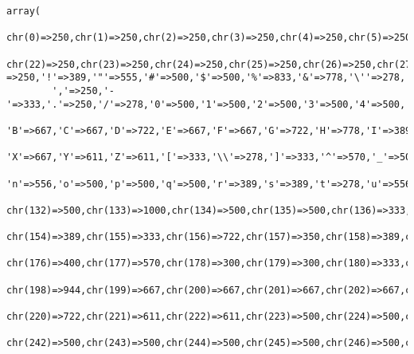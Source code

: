 \footnotesize\begin{verbatim}array(
        chr(0)=>250,chr(1)=>250,chr(2)=>250,chr(3)=>250,chr(4)=>250,chr(5)=>250,chr(6)=>250,chr(7)=>250,chr(8)=>250,chr(9)=>250,chr(10)=>250,chr(11)=>250,chr(12)=>250,chr(13)=>250,chr(14)=>250,chr(15)=>250,chr(16)=>250,chr(17)=>250,chr(18)=>250,chr(19)=>250,chr(20)=>250,chr(21)=>250,
        chr(22)=>250,chr(23)=>250,chr(24)=>250,chr(25)=>250,chr(26)=>250,chr(27)=>250,chr(28)=>250,chr(29)=>250,chr(30)=>250,chr(31)=>250, =>250,'!'=>389,'"'=>555,'#'=>500,'$'=>500,'%'=>833,'&'=>778,'\''=>278,'('=>333,')'=>333,'*'=>500,'+'=>570,
        ','=>250,'-'=>333,'.'=>250,'/'=>278,'0'=>500,'1'=>500,'2'=>500,'3'=>500,'4'=>500,'5'=>500,'6'=>500,'7'=>500,'8'=>500,'9'=>500,':'=>333,';'=>333,'<'=>570,'='=>570,'>'=>570,'?'=>500,'@'=>832,'A'=>667,
        'B'=>667,'C'=>667,'D'=>722,'E'=>667,'F'=>667,'G'=>722,'H'=>778,'I'=>389,'J'=>500,'K'=>667,'L'=>611,'M'=>889,'N'=>722,'O'=>722,'P'=>611,'Q'=>722,'R'=>667,'S'=>556,'T'=>611,'U'=>722,'V'=>667,'W'=>889,
        'X'=>667,'Y'=>611,'Z'=>611,'['=>333,'\\'=>278,']'=>333,'^'=>570,'_'=>500,'`'=>333,'a'=>500,'b'=>500,'c'=>444,'d'=>500,'e'=>444,'f'=>333,'g'=>500,'h'=>556,'i'=>278,'j'=>278,'k'=>500,'l'=>278,'m'=>778,
        'n'=>556,'o'=>500,'p'=>500,'q'=>500,'r'=>389,'s'=>389,'t'=>278,'u'=>556,'v'=>444,'w'=>667,'x'=>500,'y'=>444,'z'=>389,'{'=>348,'|'=>220,'}'=>348,'~'=>570,chr(127)=>350,chr(128)=>500,chr(129)=>350,chr(130)=>333,chr(131)=>500,
        chr(132)=>500,chr(133)=>1000,chr(134)=>500,chr(135)=>500,chr(136)=>333,chr(137)=>1000,chr(138)=>556,chr(139)=>333,chr(140)=>944,chr(141)=>350,chr(142)=>611,chr(143)=>350,chr(144)=>350,chr(145)=>333,chr(146)=>333,chr(147)=>500,chr(148)=>500,chr(149)=>350,chr(150)=>500,chr(151)=>1000,chr(152)=>333,chr(153)=>1000,
        chr(154)=>389,chr(155)=>333,chr(156)=>722,chr(157)=>350,chr(158)=>389,chr(159)=>611,chr(160)=>250,chr(161)=>389,chr(162)=>500,chr(163)=>500,chr(164)=>500,chr(165)=>500,chr(166)=>220,chr(167)=>500,chr(168)=>333,chr(169)=>747,chr(170)=>266,chr(171)=>500,chr(172)=>606,chr(173)=>333,chr(174)=>747,chr(175)=>333,
        chr(176)=>400,chr(177)=>570,chr(178)=>300,chr(179)=>300,chr(180)=>333,chr(181)=>576,chr(182)=>500,chr(183)=>250,chr(184)=>333,chr(185)=>300,chr(186)=>300,chr(187)=>500,chr(188)=>750,chr(189)=>750,chr(190)=>750,chr(191)=>500,chr(192)=>667,chr(193)=>667,chr(194)=>667,chr(195)=>667,chr(196)=>667,chr(197)=>667,
        chr(198)=>944,chr(199)=>667,chr(200)=>667,chr(201)=>667,chr(202)=>667,chr(203)=>667,chr(204)=>389,chr(205)=>389,chr(206)=>389,chr(207)=>389,chr(208)=>722,chr(209)=>722,chr(210)=>722,chr(211)=>722,chr(212)=>722,chr(213)=>722,chr(214)=>722,chr(215)=>570,chr(216)=>722,chr(217)=>722,chr(218)=>722,chr(219)=>722,
        chr(220)=>722,chr(221)=>611,chr(222)=>611,chr(223)=>500,chr(224)=>500,chr(225)=>500,chr(226)=>500,chr(227)=>500,chr(228)=>500,chr(229)=>500,chr(230)=>722,chr(231)=>444,chr(232)=>444,chr(233)=>444,chr(234)=>444,chr(235)=>444,chr(236)=>278,chr(237)=>278,chr(238)=>278,chr(239)=>278,chr(240)=>500,chr(241)=>556,
        chr(242)=>500,chr(243)=>500,chr(244)=>500,chr(245)=>500,chr(246)=>500,chr(247)=>570,chr(248)=>500,chr(249)=>556,chr(250)=>556,chr(251)=>556,chr(252)=>556,chr(253)=>444,chr(254)=>500,chr(255)=>444)
\end{verbatim}\normalsize 
